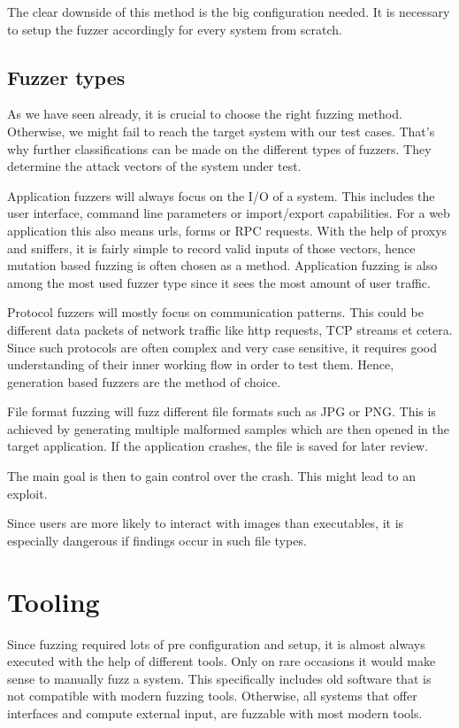 \documentclass[journal=tosc,final]{iacrtrans}
\begin{document}
   The clear downside of this method is the big configuration needed. It is necessary to setup the fuzzer accordingly for every system from scratch. 
\subsection{Fuzzer types}
As we have seen already, it is crucial to choose the right fuzzing method. Otherwise, we might fail to reach the target system with our test cases. That's  why further classifications can be made on the different types of fuzzers. They determine the attack vectors of the system under test. 

Application fuzzers will always focus on the I/O of a system. This includes the user interface, command line parameters or import/export capabilities. For a web application this also means urls, forms or RPC requests. With the help of proxys and sniffers, it is fairly simple to record valid inputs of those vectors, hence mutation based fuzzing is often chosen as a method. Application fuzzing  is also among the most used fuzzer type since it sees the most amount of user traffic.

Protocol fuzzers will mostly focus on communication patterns. This could be different data packets of network traffic like http requests, TCP streams et cetera. Since such protocols are often complex and very case sensitive, it requires good understanding of their inner working flow in order to test them. Hence, generation based fuzzers are the method of choice.

File format fuzzing will fuzz different file formats such as JPG or PNG. This is achieved by generating multiple malformed samples which are then opened in the target application. 
If the application crashes, the file is saved for later review. 

The main goal is then to gain control over the crash. This might lead to an exploit.

Since users are more likely to interact with images than executables, it is especially dangerous if findings occur in such file types.
\section{Tooling}
Since fuzzing required lots of pre configuration and setup, it is almost always executed with the help of different tools. Only on rare occasions it would make sense to manually fuzz a system. This specifically includes old software that is not compatible with modern fuzzing tools. Otherwise, all systems that offer interfaces and compute external input, are fuzzable with most modern tools. 
\end{document}
